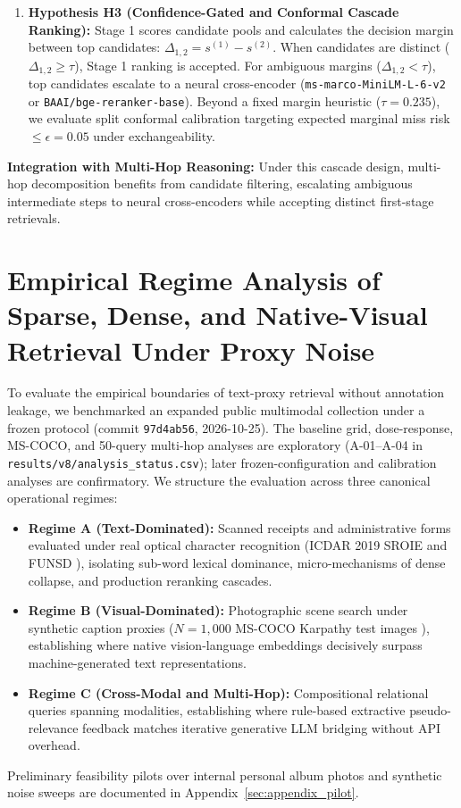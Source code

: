\documentclass[conference]{IEEEtran}
\begin{document}
\begin{enumerate}
    \item \textbf{Hypothesis H3 (Confidence-Gated and Conformal Cascade Ranking):} Stage 1 scores candidate pools and calculates the decision margin between top candidates: $\Delta_{1,2} = s^{(1)} - s^{(2)}$. When candidates are distinct ($\Delta_{1,2} \ge \tau$), Stage 1 ranking is accepted. For ambiguous margins ($\Delta_{1,2} < \tau$), top candidates escalate to a neural cross-encoder (\texttt{ms-marco-MiniLM-L-6-v2} or \texttt{BAAI/bge-reranker-base}). Beyond a fixed margin heuristic ($\tau = 0.235$), we evaluate split conformal calibration targeting expected marginal miss risk $\le \epsilon = 0.05$ under exchangeability.
\end{enumerate}

\textbf{Integration with Multi-Hop Reasoning:} Under this cascade design, multi-hop decomposition benefits from candidate filtering, escalating ambiguous intermediate steps to neural cross-encoders while accepting distinct first-stage retrievals.


\section{Empirical Regime Analysis of Sparse, Dense, and Native-Visual Retrieval Under Proxy Noise}
\label{sec:regime_analysis}
\label{sec:public_regime_analysis}

To evaluate the empirical boundaries of text-proxy retrieval without annotation leakage, we benchmarked an expanded public multimodal collection under a frozen protocol (commit \texttt{97d4ab56}, 2026-10-25). The baseline grid, dose-response, MS-COCO, and 50-query multi-hop analyses are exploratory (A-01--A-04 in \texttt{results/v8/analysis\_status.csv}); later frozen-configuration and calibration analyses are confirmatory. We structure the evaluation across three canonical operational regimes:
\begin{itemize}
    \setlength{\itemsep}{0.2pt plus 0.1pt}
    \setlength{\parskip}{0pt}
    \item \textbf{Regime A (Text-Dominated):} Scanned receipts and administrative forms evaluated under real optical character recognition (ICDAR 2019 SROIE \cite{huang2019sroie} and FUNSD \cite{jaume2019funsd}), isolating sub-word lexical dominance, micro-mechanisms of dense collapse, and production reranking cascades.
    \item \textbf{Regime B (Visual-Dominated):} Photographic scene search under synthetic caption proxies ($N=1{,}000$ MS-COCO Karpathy test images \cite{lin2014coco}), establishing where native vision-language embeddings decisively surpass machine-generated text representations.
    \item \textbf{Regime C (Cross-Modal and Multi-Hop):} Compositional relational queries spanning modalities, establishing where rule-based extractive pseudo-relevance feedback matches iterative generative LLM bridging without API overhead.
\end{itemize}
Preliminary feasibility pilots over internal personal album photos and synthetic noise sweeps are documented in Appendix~\ref{sec:appendix_pilot}.
\end{document}
